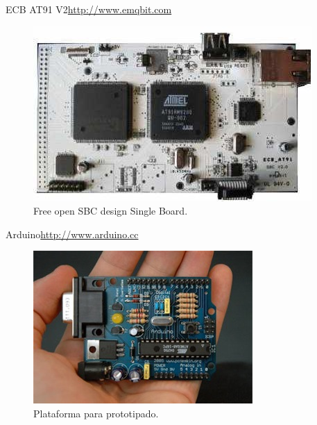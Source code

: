\documentclass{beamer}
\begin{document}
\begin{frame}{ECB AT91 V2}{\url{http://www.emqbit.com}}
  \begin{figure}
    \includegraphics[scale=0.6]{img/V2}
    \caption{Free open SBC design Single Board.}
    \label{fig:ecb}
  \end{figure}
\end{frame}

\begin{frame}{Arduino}{\url{http://www.arduino.cc}}
  \begin{figure}
    \includegraphics[scale=0.6]{img/arduino316}
    \caption{Plataforma para prototipado.}
    \label{fig:arduino}
  \end{figure}
\end{frame}

\end{document}
